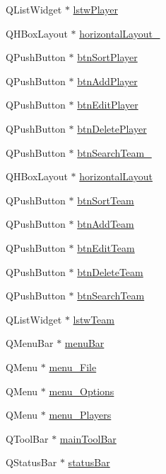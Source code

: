 \begin{DoxyCompactItemize}
Q\+List\+Widget $\ast$ \hyperlink{class_ui___main_window_a882b43c38a46678a866017cc7afcb227}{lstw\+Player}
\item 
Q\+H\+Box\+Layout $\ast$ \hyperlink{class_ui___main_window_a80867018070156432923d0266cc9fe25}{horizontal\+Layout\+\_}
\item 
Q\+Push\+Button $\ast$ \hyperlink{class_ui___main_window_a5b312303be5cbfabf0143945de3f9e73}{btn\+Sort\+Player}
\item 
Q\+Push\+Button $\ast$ \hyperlink{class_ui___main_window_aacdf61311c256d57ec9fa10f2fce7084}{btn\+Add\+Player}
\item 
Q\+Push\+Button $\ast$ \hyperlink{class_ui___main_window_ab6e7e14e17d73f8155f470549e262d73}{btn\+Edit\+Player}
\item 
Q\+Push\+Button $\ast$ \hyperlink{class_ui___main_window_a0d003a6949f5a20933761a79115f046d}{btn\+Delete\+Player}
\item 
Q\+Push\+Button $\ast$ \hyperlink{class_ui___main_window_a1cefae59d3cdcf76ff684e55396d6407}{btn\+Search\+Team\+\_}
\item 
Q\+H\+Box\+Layout $\ast$ \hyperlink{class_ui___main_window_acd6fdc9ebacc4b25b834162380d75ce8}{horizontal\+Layout}
\item 
Q\+Push\+Button $\ast$ \hyperlink{class_ui___main_window_a881f774f14055aa00d2e7250de445cb9}{btn\+Sort\+Team}
\item 
Q\+Push\+Button $\ast$ \hyperlink{class_ui___main_window_a49f17e4489c82ac9eb432e39d097a277}{btn\+Add\+Team}
\item 
Q\+Push\+Button $\ast$ \hyperlink{class_ui___main_window_a44073b704c264f596a09f9e5e735fe21}{btn\+Edit\+Team}
\item 
Q\+Push\+Button $\ast$ \hyperlink{class_ui___main_window_a7904dbcf6d39bb105cb7317b92a28026}{btn\+Delete\+Team}
\item 
Q\+Push\+Button $\ast$ \hyperlink{class_ui___main_window_a5325e466c76b176dd2462dabf1678862}{btn\+Search\+Team}
\item 
Q\+List\+Widget $\ast$ \hyperlink{class_ui___main_window_a18474f46054d16d420125e914595bf3a}{lstw\+Team}
\item 
Q\+Menu\+Bar $\ast$ \hyperlink{class_ui___main_window_a2be1c24ec9adfca18e1dcc951931457f}{menu\+Bar}
\item 
Q\+Menu $\ast$ \hyperlink{class_ui___main_window_a6d6a92a6bccde97ab13fce9014eb25d4}{menu\+\_\+\+File}
\item 
Q\+Menu $\ast$ \hyperlink{class_ui___main_window_a652e71e64e3b3dbf31b4fa1000b50064}{menu\+\_\+\+Options}
\item 
Q\+Menu $\ast$ \hyperlink{class_ui___main_window_a4385d24e8bb92bc5cd776c92d7f16439}{menu\+\_\+\+Players}
\item 
Q\+Tool\+Bar $\ast$ \hyperlink{class_ui___main_window_a5172877001c8c7b4e0f6de50421867d1}{main\+Tool\+Bar}
\item 
Q\+Status\+Bar $\ast$ \hyperlink{class_ui___main_window_a50fa481337604bcc8bf68de18ab16ecd}{status\+Bar}
\end{DoxyCompactItemize}



